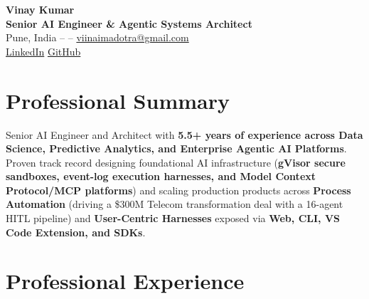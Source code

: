 \documentclass[10pt,a4paper]{article}
\begin{document}
\begin{center}
    {\Huge \textbf{Vinay Kumar}}\\[3pt]
    {\large \textbf{Senior AI Engineer \& Agentic Systems Architect}}\\[3pt]
    Pune, India \quad --  \quad -- \quad \href{mailto:viinaimadotra@gmail.com}{viinaimadotra@gmail.com}\\[2pt]
    \href{https://www.linkedin.com/in/viinai}{LinkedIn} \quad \textbar \quad \href{https://github.com/ViinAI}{GitHub}
\end{center}

\vspace{-4pt}

\section*{Professional Summary}
Senior AI Engineer and Architect with \textbf{5.5+ years of experience across Data Science, Predictive Analytics, and Enterprise Agentic AI Platforms}. Proven track record designing foundational AI infrastructure (\textbf{gVisor secure sandboxes, event-log execution harnesses, and Model Context Protocol/MCP platforms}) and scaling production products across \textbf{Process Automation} (driving a \$300M Telecom transformation deal with a 16-agent HITL pipeline) and \textbf{User-Centric Harnesses} exposed via \textbf{Web, CLI, VS Code Extension, and SDKs}.

\section*{Professional Experience}
\end{document}
